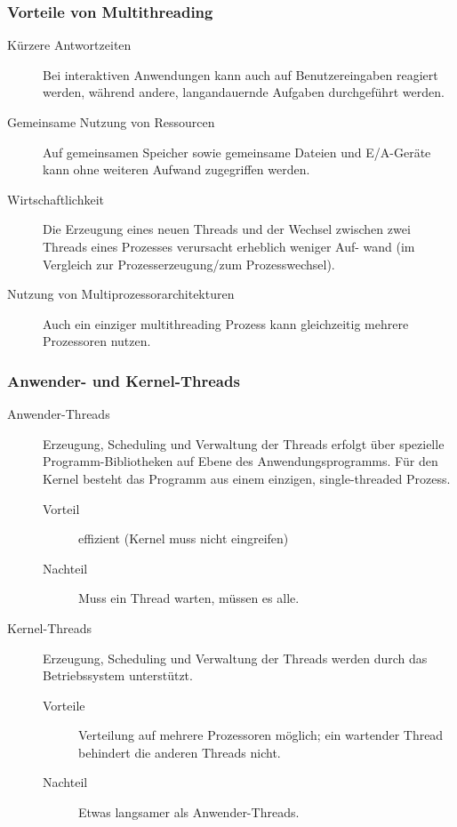 \documentclass[11pt]{article}
\begin{document}
\subsubsection*{Vorteile von Multithreading}
\label{sec:orga05270e}
\begin{description}
\item[{Kürzere Antwortzeiten}] Bei interaktiven Anwendungen kann auch auf
Benutzereingaben reagiert werden, während andere, langandauernde
Aufgaben durchgeführt werden.
\item[{Gemeinsame Nutzung von Ressourcen}] Auf gemeinsamen Speicher sowie
gemeinsame Dateien und E/A-Geräte kann ohne weiteren Aufwand
zugegriffen werden.
\item[{Wirtschaftlichkeit}] Die Erzeugung eines neuen Threads und der
Wechsel zwischen zwei Threads eines Prozesses verursacht
erheblich weniger Auf- wand (im Vergleich zur
Prozesserzeugung/zum Prozesswechsel).
\item[{Nutzung von Multiprozessorarchitekturen}] Auch ein einziger
multithreading Prozess kann gleichzeitig mehrere Prozessoren
nutzen.
\end{description}
\subsubsection*{Anwender- und Kernel-Threads}
\label{sec:orgb11ce57}
\begin{description}
\item[{Anwender-Threads}] Erzeugung, Scheduling und Verwaltung der Threads
erfolgt über spezielle Programm-Bibliotheken auf Ebene des
Anwendungsprogramms. Für den Kernel besteht das Programm aus
einem einzigen, single-threaded Prozess.
\begin{description}
\item[{Vorteil}] effizient (Kernel muss nicht eingreifen)
\item[{Nachteil}] Muss ein Thread warten, müssen es alle.
\end{description}
\item[{Kernel-Threads}] Erzeugung, Scheduling und Verwaltung der Threads
werden durch das Betriebssystem unterstützt.
\begin{description}
\item[{Vorteile}] Verteilung auf mehrere Prozessoren möglich; ein
wartender Thread behindert die anderen Threads nicht.
\item[{Nachteil}] Etwas langsamer als Anwender-Threads.
\end{description}
\end{description}
\end{document}
